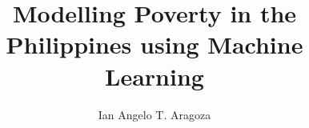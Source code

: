 \documentclass[final]{nip}
\title{Modelling Poverty in the Philippines using Machine Learning}
\author{Ian Angelo T. Aragoza}
\begin{document}
    \maketitle
    \makePrelim

    
    
    
    
    

    \appendix
    
    
    
\end{document}
